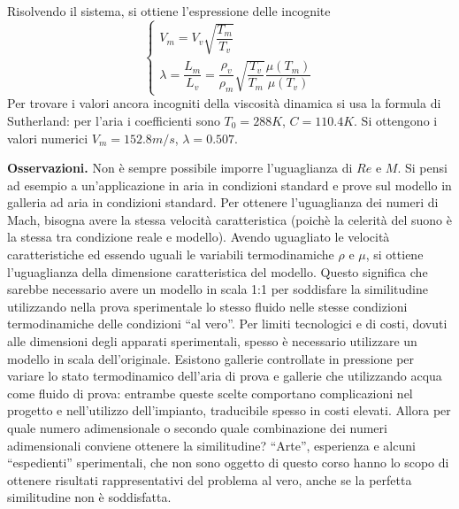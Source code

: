 %
Risolvendo il sistema, si ottiene l'espressione delle incognite
\begin{equation}
   \begin{cases}
     V_m = V_v \sqrt{\dfrac{T_m}{T_v}} \\
     \lambda = \dfrac{L_m}{L_v} = \dfrac{\rho_v}{\rho_m} 
     \sqrt{\dfrac{T_v}{T_m}} \dfrac{\mu(T_m)}{\mu(T_v)}
   \end{cases}
\end{equation}
%
Per trovare i valori ancora incogniti della viscosità dinamica si usa la formula di Sutherland: per l'aria i coefficienti sono $T_0 = 288 K$, $C = 110.4 K$.
Si ottengono i valori numerici $V_m = 152.8 m/s$, $\lambda = 0.507$.

\vspace{0.5cm}
\textbf{Osservazioni.} Non è sempre possibile imporre l'uguaglianza di $Re$ e $M$. Si pensi ad esempio a un'applicazione in aria in condizioni standard e prove sul modello in galleria ad aria in condizioni standard.
Per ottenere l'uguaglianza dei numeri di Mach, bisogna avere la stessa velocità caratteristica (poichè la celerità del suono è la stessa tra condizione reale e modello). Avendo uguagliato le velocità caratteristiche ed essendo uguali le variabili termodinamiche $\rho$ e $\mu$, si ottiene l'uguaglianza della dimensione caratteristica del modello. Questo significa che sarebbe necessario avere un modello in scala 1:1 per soddisfare la similitudine utilizzando nella prova sperimentale lo stesso fluido nelle stesse condizioni termodinamiche delle condizioni ``al vero''.
Per limiti tecnologici e di costi, dovuti alle dimensioni degli apparati sperimentali, spesso è necessario utilizzare un modello in scala dell'originale. Esistono gallerie controllate in pressione per variare lo stato termodinamico dell'aria di prova e gallerie che utilizzando acqua come fluido di prova: entrambe queste scelte comportano complicazioni nel progetto e nell'utilizzo dell'impianto, traducibile spesso in costi elevati.
%
\newline
Allora per quale numero adimensionale o secondo quale combinazione dei numeri adimensionali conviene ottenere la similitudine? ``Arte'', esperienza e alcuni ``espedienti'' sperimentali, che non sono oggetto di questo corso hanno lo scopo di ottenere risultati rappresentativi del problema al vero, anche se la perfetta similitudine non è soddisfatta.
